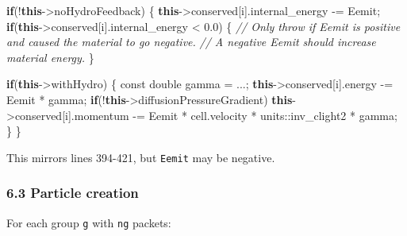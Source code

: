 \documentclass[
]{article}
\newenvironment{Shaded}{}{}
\newcommand{\AttributeTok}[1]{\textcolor[rgb]{0.49,0.56,0.16}{#1}}
\newcommand{\CommentTok}[1]{\textcolor[rgb]{0.38,0.63,0.69}{\textit{#1}}}
\newcommand{\ControlFlowTok}[1]{\textcolor[rgb]{0.00,0.44,0.13}{\textbf{#1}}}
\newcommand{\DataTypeTok}[1]{\textcolor[rgb]{0.56,0.13,0.00}{#1}}
\newcommand{\FloatTok}[1]{\textcolor[rgb]{0.25,0.63,0.44}{#1}}
\newcommand{\KeywordTok}[1]{\textcolor[rgb]{0.00,0.44,0.13}{\textbf{#1}}}
\newcommand{\NormalTok}[1]{#1}
\newcommand{\OperatorTok}[1]{\textcolor[rgb]{0.40,0.40,0.40}{#1}}
\begin{document}
\begin{Shaded}
\begin{Highlighting}[]
\ControlFlowTok{if}\OperatorTok{(!}\KeywordTok{this}\OperatorTok{{-}\textgreater{}}\NormalTok{noHydroFeedback}\OperatorTok{)}
\OperatorTok{\{}
    \KeywordTok{this}\OperatorTok{{-}\textgreater{}}\NormalTok{conserved}\OperatorTok{[}\NormalTok{i}\OperatorTok{].}\NormalTok{internal\_energy }\OperatorTok{{-}=}\NormalTok{ Eemit}\OperatorTok{;}
    \ControlFlowTok{if}\OperatorTok{(}\KeywordTok{this}\OperatorTok{{-}\textgreater{}}\NormalTok{conserved}\OperatorTok{[}\NormalTok{i}\OperatorTok{].}\NormalTok{internal\_energy }\OperatorTok{\textless{}} \FloatTok{0.0}\OperatorTok{)}
    \OperatorTok{\{}
        \CommentTok{// Only throw if Eemit is positive and caused the material to go negative.}
        \CommentTok{// A negative Eemit should increase material energy.}
    \OperatorTok{\}}

    \ControlFlowTok{if}\OperatorTok{(}\KeywordTok{this}\OperatorTok{{-}\textgreater{}}\NormalTok{withHydro}\OperatorTok{)}
    \OperatorTok{\{}
        \AttributeTok{const} \DataTypeTok{double}\NormalTok{ gamma }\OperatorTok{=} \OperatorTok{...;}
        \KeywordTok{this}\OperatorTok{{-}\textgreater{}}\NormalTok{conserved}\OperatorTok{[}\NormalTok{i}\OperatorTok{].}\NormalTok{energy }\OperatorTok{{-}=}\NormalTok{ Eemit }\OperatorTok{*}\NormalTok{ gamma}\OperatorTok{;}
        \ControlFlowTok{if}\OperatorTok{(!}\KeywordTok{this}\OperatorTok{{-}\textgreater{}}\NormalTok{diffusionPressureGradient}\OperatorTok{)}
            \KeywordTok{this}\OperatorTok{{-}\textgreater{}}\NormalTok{conserved}\OperatorTok{[}\NormalTok{i}\OperatorTok{].}\NormalTok{momentum }\OperatorTok{{-}=}\NormalTok{ Eemit }\OperatorTok{*}\NormalTok{ cell}\OperatorTok{.}\NormalTok{velocity }\OperatorTok{*}\NormalTok{ units}\OperatorTok{::}\NormalTok{inv\_clight2 }\OperatorTok{*}\NormalTok{ gamma}\OperatorTok{;}
    \OperatorTok{\}}
\OperatorTok{\}}
\end{Highlighting}
\end{Shaded}

This mirrors lines 394-421, but \texttt{Eemit} may be negative.

\subsubsection{6.3 Particle creation}\label{particle-creation}

For each group \texttt{g} with \texttt{ng} packets:
\end{document}
